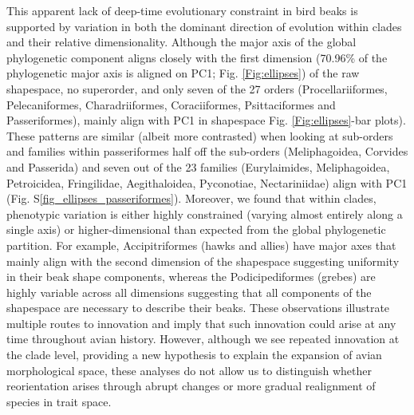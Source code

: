 \documentclass[12pt,letterpaper]{article}
\begin{document}
This apparent lack of deep-time evolutionary constraint in bird beaks is supported by variation in both the dominant direction of evolution within clades and their relative dimensionality.
Although the major axis of the global phylogenetic component aligns closely with the first dimension (70.96\% of the phylogenetic major axis is aligned on PC1; Fig. \ref{Fig:ellipses}) of the raw shapespace, no superorder, and only seven of the 27 orders (Procellariiformes, Pelecaniformes, Charadriiformes, Coraciiformes, Psittaciformes and Passeriformes), mainly align with PC1 in shapespace Fig. \ref{Fig:ellipses}-bar plots).
These patterns are similar (albeit more contrasted) when looking at sub-orders and families within passeriformes half off the sub-orders (Meliphagoidea, Corvides and Passerida) and seven out of the 23 families (Eurylaimides, Meliphagoidea, Petroicidea, Fringilidae, Aegithaloidea, Pyconotiae, Nectariniidae) align with PC1 (Fig. S\ref{fig_ellipses_passeriformes}).
Moreover, we found that within clades, phenotypic variation is either highly constrained (varying almost entirely along a single axis) or higher-dimensional than expected from the global phylogenetic partition.
For example, Accipitriformes (hawks and allies) have major axes that mainly align with the second dimension of the shapespace suggesting uniformity in their beak shape components, whereas the Podicipediformes (grebes) are highly variable across all dimensions suggesting that all components of the shapespace are necessary to describe their beaks.
These observations illustrate multiple routes to innovation and imply that such innovation could arise at any time throughout avian history.
However, although we see repeated innovation at the clade level, providing a new hypothesis to explain the expansion of avian morphological space, these analyses do not allow us to distinguish whether reorientation arises through abrupt changes or more gradual realignment of species in trait space.
\end{document}
